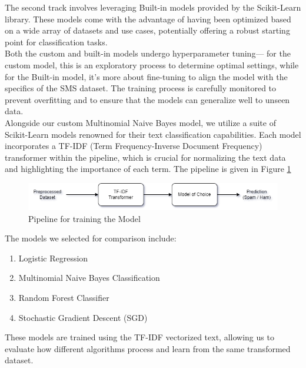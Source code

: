\documentclass[12pt]{article}
\begin{document}
The second track involves leveraging Built-in models provided by the Scikit-Learn library. These models come with the advantage of having been optimized based on a wide array of datasets and use cases, potentially offering a robust starting point for classification tasks.\\

Both the custom and built-in models undergo hyperparameter tuning— for the custom model, this is an exploratory process to determine optimal settings, while for the Built-in model, it's more about fine-tuning to align the model with the specifics of the SMS dataset. The training process is carefully monitored to prevent overfitting and to ensure that the models can generalize well to unseen data.\\

Alongside our custom Multinomial Naive Bayes model, we utilize a suite of Scikit-Learn models renowned for their text classification capabilities. Each model incorporates a TF-IDF (Term Frequency-Inverse Document Frequency)\cite{Simha_2021} transformer within the pipeline, which is crucial for normalizing the text data and highlighting the importance of each term. The pipeline is given in Figure \ref{pipeline}

\begin{figure}[!htbp]
    \centering
    \includegraphics[scale=0.6]{Pipeline.png}
    \caption{Pipeline for training the Model}
    \label{pipeline}
\end{figure}    

The models we selected for comparison include:

\begin{enumerate}
    \item Logistic Regression
    \item Multinomial Naive Bayes Classification
    \item Random Forest Classifier
    \item Stochastic Gradient Descent (SGD)
\end{enumerate}

These models are trained using the TF-IDF vectorized text, allowing us to evaluate how different algorithms process and learn from the same transformed dataset.
\end{document}
